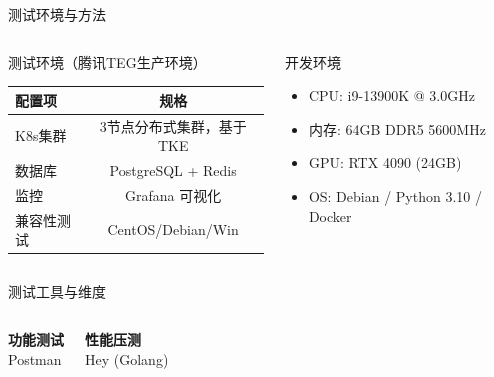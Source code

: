 \documentclass[aspectratio=169,UTF8,xcolor=table]{ctexbeamer}
\begin{document}
\begin{frame}{测试环境与方法}
  \begin{columns}[T]
    \begin{block}{测试环境（腾讯TEG生产环境）}
      \begin{table}
        \begin{tabular}{|l|c|}
          \hline
          \rowcolor{ustcblue!30}
          \textbf{配置项} & \textbf{规格} \\
          \hline
          K8s集群 & 3节点分布式集群，基于TKE \\
          \hline
          数据库 & PostgreSQL + Redis \\
          \hline
          监控 & Grafana 可视化 \\
          \hline
          兼容性测试 & CentOS/Debian/Win \\
          \hline
        \end{tabular}
      \end{table}
    \end{block}

    \begin{block}{开发环境}
      \begin{itemize}
        \item CPU: i9-13900K @ 3.0GHz
        \item 内存: 64GB DDR5 5600MHz
        \item GPU: RTX 4090 (24GB)
        \item OS: Debian / Python 3.10 / Docker
      \end{itemize}
    \end{block}
  \end{columns}

  \vspace{0.3cm}
  \begin{block}{测试工具与维度}
    \begin{columns}[T]
      \begin{center}
        \textbf{功能测试}\\[2pt]
        \footnotesize Postman
      \end{center}

      \begin{center}
        \textbf{性能压测}\\[2pt]
        \footnotesize Hey (Golang)
      \end{center}


\end{columns}
\end{block}
\end{frame}
\end{document}
